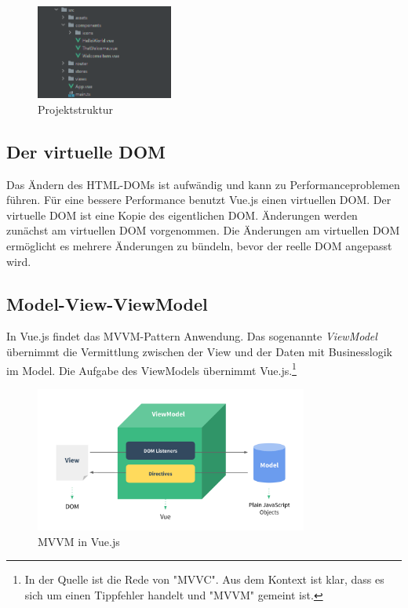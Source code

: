 \begin{figure}[H]
    \centering
    \includegraphics[width=0.4\textwidth]{img/vueFileStructure}
    \caption{Projektstruktur}
    \label{fig:vueProjektstruktur}
\end{figure}

\subsection*{Der virtuelle DOM}
Das Ändern des HTML-DOMs ist aufwändig und kann zu Performanceproblemen führen.
Für eine bessere Performance benutzt Vue.js einen virtuellen DOM.
Der virtuelle DOM ist eine Kopie des eigentlichen DOM.
Änderungen werden zunächst am virtuellen DOM vorgenommen.
Die Änderungen am virtuellen DOM ermöglicht es mehrere Änderungen zu bündeln,
bevor der reelle DOM angepasst wird. \cite[S. 10-11]{steyer2019} %

\subsection*{Model-View-ViewModel}
In Vue.js findet das MVVM-Pattern Anwendung.
Das sogenannte \emph{ViewModel} übernimmt die Vermittlung zwischen der View
und der Daten mit Businesslogik im Model.
Die Aufgabe des ViewModels übernimmt Vue.js.\cite[S. 43]{steyer2019}\footnote{In der Quelle ist die Rede von "MVVC". Aus dem Kontext ist klar, dass es sich um einen Tippfehler handelt und "MVVM" gemeint ist.}

\begin{figure}[H]
    \centering
    \includegraphics[width=0.8\textwidth]{img/mvvm}
    \caption{MVVM in Vue.js \cite{gettingStarted012}}
    \label{fig:mvvm}
\end{figure}

